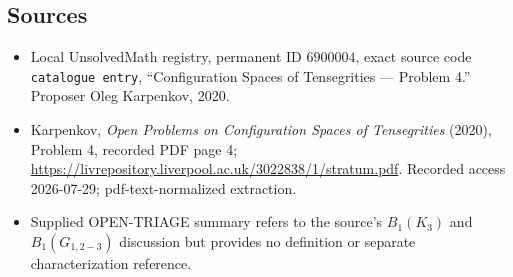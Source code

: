 \documentclass[11pt]{article}
\begin{document}
\subsection{Sources}
\begin{itemize}
\item Local UnsolvedMath registry, permanent ID \(6900004\), exact source code \texttt{catalogue entry}, ``Configuration Spaces of Tensegrities --- Problem 4.'' Proposer Oleg Karpenkov, 2020.
\item Karpenkov, \emph{Open Problems on Configuration Spaces of Tensegrities} (2020), Problem 4, recorded PDF page 4; \url{https://livrepository.liverpool.ac.uk/3022838/1/stratum.pdf}. Recorded access 2026-07-29; pdf-text-normalized extraction.
\item Supplied OPEN-TRIAGE summary refers to the source's \(B_1(K_3)\) and \(B_1(G_{1,2-3})\) discussion but provides no definition or separate characterization reference.
\end{itemize}
\end{document}
